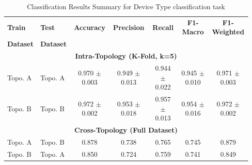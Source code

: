 \begin{table}[t]
\centering
\footnotesize
\setlength{\tabcolsep}{3.5pt}
\renewcommand{\arraystretch}{1.1}
\caption{Classification Results Summary for Device Type classification task}
\label{tab:classification_results_type}
\begin{tabularx}{\columnwidth}{l l c c c c c}
\toprule
\textbf{Train} & \textbf{Test} & \textbf{Accuracy} & \textbf{Precision} & \textbf{Recall} & \textbf{F1-Macro} & \textbf{F1-Weighted} \\
\textbf{Dataset} & \textbf{Dataset} &  &  &  &  &  \\
\midrule
\multicolumn{7}{c}{\textbf{Intra-Topology (K-Fold, k=5)}} \\
\midrule
Topo. A & Topo. A & 0.970 $\pm$ 0.003 & 0.949 $\pm$ 0.013 & 0.944 $\pm$ 0.022 & 0.945 $\pm$ 0.010 & 0.971 $\pm$ 0.003 \\
Topo. B & Topo. B & 0.972 $\pm$ 0.002 & 0.953 $\pm$ 0.018 & 0.957 $\pm$ 0.013 & 0.954 $\pm$ 0.016 & 0.972 $\pm$ 0.002 \\
\midrule
\multicolumn{7}{c}{\textbf{Cross-Topology (Full Dataset)}} \\
\midrule
Topo. A & Topo. B & 0.878 & 0.738 & 0.765 & 0.745 & 0.879 \\
Topo. B & Topo. A & 0.850 & 0.724 & 0.759 & 0.741 & 0.849 \\
\bottomrule
\end{tabularx}
\end{table}







